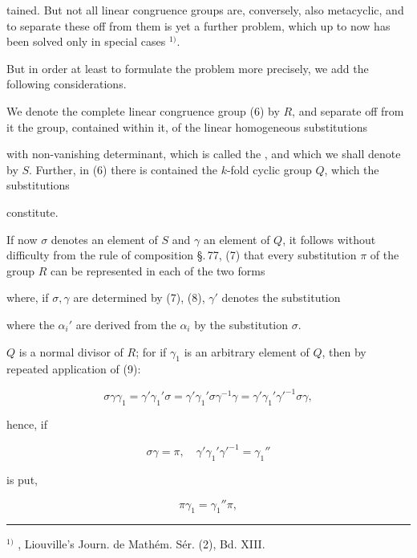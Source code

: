 tained. But not all linear congruence groups are, conversely, also metacyclic, and to separate these off from them is yet a further problem, which up to now has been solved only in special cases $^{1)}$.

But in order at least to formulate the problem more precisely, we add the following considerations.

We denote the complete linear congruence group (6) by $R$, and separate off from it the group, contained within it, of the linear homogeneous substitutions


with non-vanishing determinant, which is called the , and which we shall denote by $S$. Further, in (6) there is contained the $k$-fold cyclic group $Q$, which the substitutions


constitute.

If now $\sigma$ denotes an element of $S$ and $\gamma$ an element of $Q$, it follows without difficulty from the rule of composition \S.\,77, (7) that every substitution $\pi$ of the group $R$ can be represented  in each of the two forms


where, if $\sigma, \gamma$ are determined by (7), (8), $\gamma'$ denotes the substitution


where the $\alpha_i'$ are derived from the $\alpha_i$ by the substitution $\sigma$.

$Q$ is a normal divisor of $R$; for if $\gamma_1$ is an arbitrary element of $Q$, then by repeated application of (9):

\[
\sigma\gamma\gamma_1 = \gamma'\gamma_1'\sigma = \gamma'\gamma_1'\sigma\gamma^{-1}\gamma = \gamma'\gamma_1'\gamma'^{-1}\sigma\gamma,
\]

hence, if

\[
\sigma\gamma = \pi, \quad \gamma'\gamma_1'\gamma'^{-1} = \gamma_1''
\]

is put,

\[
\pi\gamma_1 = \gamma_1''\pi,
\]

\begin{center}
\rule{4cm}{0.4pt}
\end{center}

$^{1)}$ , Liouville's Journ. de Math\'em. S\'er. (2), Bd. XIII.
